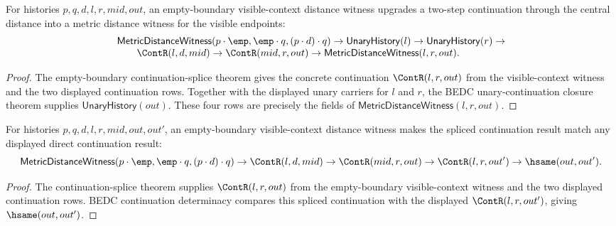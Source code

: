 \begin{theorem}
\label{thm:metric-distance-witness-empty-boundary-visible-context-witness-splice}
For histories $p,q,d,l,r,mid,out$, an empty-boundary visible-context distance
witness upgrades a two-step continuation through the central distance into a
metric distance witness for the visible endpoints:
$$
\begin{array}{l}
\mathsf{MetricDistanceWitness}(p\cdot\emp,\emp\cdot q,(p\cdot d)\cdot q)
\to
\mathsf{UnaryHistory}(l)\to
\mathsf{UnaryHistory}(r)\to\\
\qquad
\ContR(l,d,mid)\to
\ContR(mid,r,out)\to
\mathsf{MetricDistanceWitness}(l,r,out).
\end{array}
$$
\end{theorem}
\begin{proof}
The empty-boundary continuation-splice theorem gives the concrete continuation
$\ContR(l,r,out)$ from the visible-context witness and the two displayed
continuation rows. Together with the displayed unary carriers for $l$ and $r$,
the BEDC unary-continuation closure theorem supplies $\mathsf{UnaryHistory}(out)$.
These four rows are precisely the fields of
$\mathsf{MetricDistanceWitness}(l,r,out)$.
\end{proof}

\begin{theorem}
\label{thm:metric-empty-boundary-visible-context-continuation-splice-hsame}
For histories $p,q,d,l,r,mid,out,out'$, an empty-boundary visible-context
distance witness makes the spliced continuation result match any displayed
direct continuation result:
$$
\mathsf{MetricDistanceWitness}(p\cdot\emp,\emp\cdot q,(p\cdot d)\cdot q)
\to
\ContR(l,d,mid)\to
\ContR(mid,r,out)\to
\ContR(l,r,out')\to
\hsame(out,out').
$$
\end{theorem}
\begin{proof}
The continuation-splice theorem supplies \(\ContR(l,r,out)\) from the
empty-boundary visible-context witness and the two displayed continuation
rows. BEDC continuation determinacy compares this spliced continuation with
the displayed \(\ContR(l,r,out')\), giving \(\hsame(out,out')\).
\end{proof}

